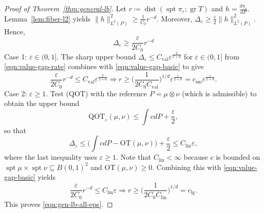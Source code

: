 \documentclass{article}
\theoremstyle{plain}
\theoremstyle{definition}
\theoremstyle{remark}
\numberwithin{equation}{section}
\DeclareMathOperator{\spt}{spt}
\DeclareMathOperator{\gr}{gr}
\DeclareMathOperator{\dist}{dist}
\newcommand{\OT}{\mathrm{OT}}
\newcommand{\QOT}{\mathrm{QOT}}
\begin{document}
\begin{proof}[Proof of Theorem~\ref{thm:general-lb}]
Let $r\coloneqq\dist(\spt\pi_\varepsilon;\gr T)$ and $h=\frac{d\pi_\varepsilon}{dP}$. 
Lemma~\ref{lem:fiber-l2} yields $\|h\|_{L^2(P)}^2\ge\frac{1}{C_0}r^{-d}$.
Moreover, $\Delta_\varepsilon\ge\frac{\varepsilon}{2}\|h\|_{L^2(P)}^2$.
Hence,
\begin{equation}\label{eqn:value-gap-basic}
\Delta_\varepsilon\ge\frac{\varepsilon}{2C_0}r^{-d}
\end{equation}
Case 1: $\varepsilon\in(0,1]$. 
The sharp upper bound $\Delta_\varepsilon\le C_\mathrm{val}\varepsilon^{\frac{2}{2+d}}$ for $\varepsilon\in(0,1]$ from \eqref{eqn:value-gap-rate} combines with \eqref{eqn:value-gap-basic} to give
\[
\frac{\varepsilon}{2C_0}r^{-d}\le C_\mathrm{val}\varepsilon^{\frac{2}{2+d}}\Longrightarrow r\ge\Big(\frac{1}{2C_0C_\mathrm{val}}\Big)^{1/d}\varepsilon^{\frac{1}{2+d}}=c_{\mathrm{sm}}\varepsilon^{\frac{1}{2+d}}.
\]
Case 2: $\varepsilon\ge1$. 
Test ($\QOT$) with the reference $P=\mu\otimes\nu$ (which is admissible) to obtain the upper bound
$$
\QOT_\varepsilon(\mu,\nu)\le\int cdP+\frac{\varepsilon}{2},
$$
so that
\[
\Delta_\varepsilon\le\Big(\int cdP-\OT(\mu,\nu)\Big)+\frac{\varepsilon}{2}\le C_\mathrm{lin}\varepsilon,
\]
where the last inequality uses $\varepsilon\ge1$.
Note that $C_{\mathrm{lin}}<\infty$ because $c$ is bounded on $\spt\mu\times\spt\nu\subseteq B(0,1)^2$ and $\OT(\mu,\nu)\ge0$.
Combining this with \eqref{eqn:value-gap-basic} yields
$$
\frac{\varepsilon}{2C_0}r^{-d}\le C_\mathrm{lin}\varepsilon\Longrightarrow r\ge\Big(\frac{1}{2C_0C_\mathrm{lin}}\Big)^{1/d}=c_{\mathrm{lg}}.
$$
This proves \eqref{eqn:gen-lb-all-eps}.
\end{proof}
\end{document}
